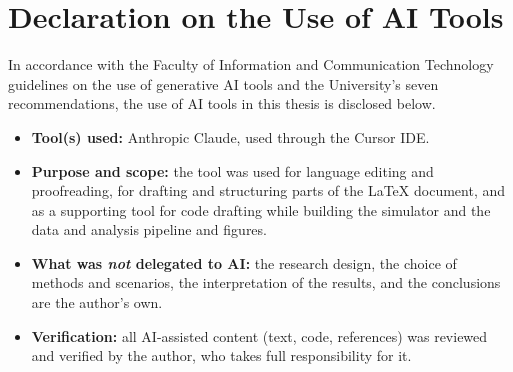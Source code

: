 %

\chapter{Declaration on the Use of AI Tools}
\label{app:ai}

In accordance with the Faculty of Information and Communication Technology
guidelines on the use of generative AI tools and the University's seven
recommendations, the use of AI tools in this thesis is disclosed below.

\begin{itemize}
  \item \textbf{Tool(s) used:} Anthropic Claude, used through the Cursor IDE.
  \item \textbf{Purpose and scope:} the tool was used for language editing and
  proofreading, for drafting and structuring parts of the LaTeX document, and as
  a supporting tool for code drafting while building the simulator and the
  data and analysis pipeline and figures.
  \item \textbf{What was \emph{not} delegated to AI:} the research design, the
  choice of methods and scenarios, the interpretation of the results, and the
  conclusions are the author's own.
  \item \textbf{Verification:} all AI-assisted content (text, code, references)
  was reviewed and verified by the author, who takes full responsibility for it.
\end{itemize}


